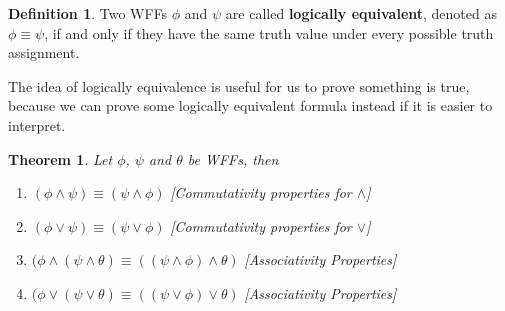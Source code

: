 \documentclass[11pt]{article}
\theoremstyle{definition}
\newtheorem{defn}{Definition}[subsection]
\newtheorem{theorem}{Theorem}[subsection]
\begin{document}
\begin{shaded}
\begin{defn}
    Two WFFs $\phi$ and $\psi$ are called \textbf{logically equivalent}, denoted as $\phi \equiv \psi$, if and only if they have the same truth value under every possible truth assignment. 
\end{defn}
\end{shaded}

The idea of logically equivalence is useful for us to prove something is true, because we can prove some logically equivalent formula instead if it is easier to interpret.
\begin{theorem}
    \textit{Let $\phi$, $\psi$ and $\theta$ be WFFs, then}
    \begin{enumerate}
        \item $(\phi \wedge \psi) \equiv (\psi \wedge \phi)$ \textit{[Commutativity properties for $\wedge$]}
        \item $(\phi \vee \psi) \equiv (\psi \vee \phi)$ \textit{[Commutativity properties for $\vee$]}
        \item $(\phi \wedge (\psi \wedge \theta) \equiv ((\psi \wedge \phi) \wedge \theta)$ \textit{[Associativity Properties]}
        \item $(\phi \vee (\psi \vee \theta) \equiv ((\psi \vee \phi) \vee \theta)$ \textit{[Associativity Properties]}
    \end{enumerate}
\end{theorem}
\newpage
\end{document}
